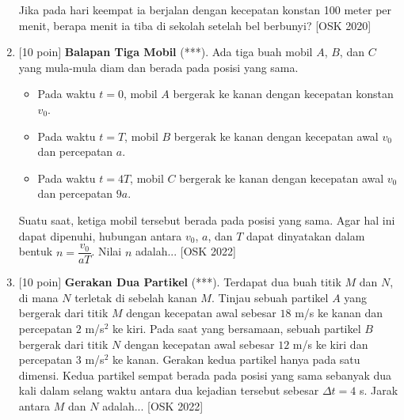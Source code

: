 \documentclass[12pt, a4paper]{article}\usepackage[utf8]{inputenc}
\theoremstyle{definition}
\theoremstyle{definition}
\begin{document}
\begin{enumerate}
\begin{itemize}
		\end{itemize}
		
		Jika pada hari keempat ia berjalan dengan kecepatan konstan 100 meter per menit, berapa menit ia tiba di sekolah setelah bel berbunyi? [OSK 2020]
		
		\item $[$10 poin$]$ \textbf{Balapan Tiga Mobil} (***). Ada tiga buah mobil $A$, $B$, dan $C$ yang mula-mula diam dan berada pada posisi yang sama. 
		\begin{itemize}
			\item Pada waktu $t = 0$, mobil $A$ bergerak ke kanan dengan kecepatan konstan $v_0$.
			\item Pada waktu $t = T$, mobil $B$ bergerak ke kanan dengan kecepatan awal $v_0$ dan percepatan $a$.
			\item Pada waktu $t = 4T$, mobil $C$ bergerak ke kanan dengan kecepatan awal $v_0$ dan percepatan $9a$.
		\end{itemize}
		Suatu saat, ketiga mobil tersebut berada pada posisi yang sama. Agar hal ini dapat dipenuhi, hubungan antara $v_0$, $a$, dan $T$ dapat dinyatakan dalam bentuk $n = \dfrac{v_0}{aT}$. Nilai $n$ adalah... [OSK 2022]
		
		\item $[$10 poin$]$ \textbf{Gerakan Dua Partikel} (***). Terdapat dua buah titik $M$ dan $N$, di mana $N$ terletak di sebelah kanan $M$. Tinjau sebuah partikel $A$ yang bergerak dari titik $M$ dengan kecepatan awal sebesar $18$ m/s ke kanan dan percepatan $2$ m/s$^2$ ke kiri. Pada saat yang bersamaan, sebuah partikel $B$ bergerak dari titik $N$ dengan kecepatan awal sebesar $12$ m/s ke kiri dan percepatan $3$ m/s$^2$ ke kanan. Gerakan kedua partikel hanya pada satu dimensi. Kedua partikel sempat berada pada posisi yang sama sebanyak dua kali dalam selang waktu antara dua kejadian tersebut sebesar $\Delta t = 4$ s. Jarak antara $M$ dan $N$ adalah... [OSK 2022]
		
		

\end{enumerate}
\end{document}
